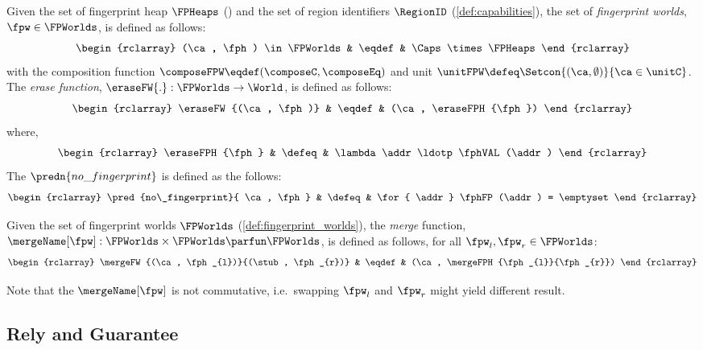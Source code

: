 \begin{definition}
\label{def:fingerprint_worlds}
Given the set of fingerprint heap $\FPHeaps$ () and the set of region identifiers $\RegionID$ (\ref{def:capabilities}), the set of \emph{fingerprint worlds}, $\fpw \in \FPWorlds$, is defined as follows:
\[
\begin{rclarray}
	(\ca, \fph) \in \FPWorlds  & \eqdef & \Caps \times \FPHeaps
\end{rclarray}
\]
with the composition function \( \composeFPW \eqdef (\composeC, \composeEq) \) and unit \( \unitFPW  \defeq \Setcon{(\ca, \emptyset)}{\ca \in \unitC }\).
The \emph{erase function}, $\eraseFW{.}: \FPWorlds \rightarrow \World$, is defined as follows:
\[
\begin{rclarray}
	\eraseFW{(\ca, \fph)} & \eqdef & (\ca, \eraseFPH{\fph})
\end{rclarray}
\]
where,
\[
\begin{rclarray}
	\eraseFPH{\fph} & \defeq & \lambda \addr \ldotp \fphVAL(\addr)
\end{rclarray}
\]
The \( \predn{no\_fingerprint} \) is defined as the follows:
\[
\begin{rclarray}
    \pred{no\_fingerprint}{ \ca, \fph } & \defeq & \for{ \addr } \fphFP(\addr) = \emptyset
\end{rclarray}
\]
\end{definition}

\begin{definition}
Given the set of fingerprint worlds $\FPWorlds$ (\ref{def:fingerprint_worlds}), the \emph{merge} function, $\mergeName[\fpw]: \FPWorlds \times \FPWorlds \parfun \FPWorlds$, is defined as follows, for all $\fpw_{l},\fpw_{r} \in \FPWorlds$:
\[
    \begin{rclarray}
	\mergeFW{(\ca, \fph_{l})}{(\stub, \fph_{r})} & \eqdef & (\ca, \mergeFPH{\fph_{l}}{\fph_{r}}) 
    \end{rclarray}
\]
\end{definition}

Note that the \( \mergeName[\fpw] \) is not commutative, i.e.\ swapping \( \fpw_{l}\) and \( \fpw_{r}\) might yield different result.

\subsection{Rely and Guarantee}

